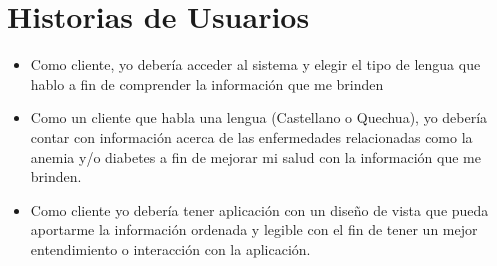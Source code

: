 \chapter{Historias de Usuarios}
\begin{itemize}

\item Como cliente, yo debería acceder al sistema y elegir el tipo de lengua que hablo a fin de comprender la información que me brinden
\item Como un cliente que habla una lengua (Castellano o Quechua), yo debería contar con información acerca de las enfermedades relacionadas como la anemia y/o diabetes a fin de mejorar mi salud con la información que me brinden. 
\item Como cliente yo debería tener aplicación con un diseño de vista que pueda aportarme la información ordenada y legible con el fin de tener un mejor entendimiento o interacción con la aplicación.
\end{itemize}